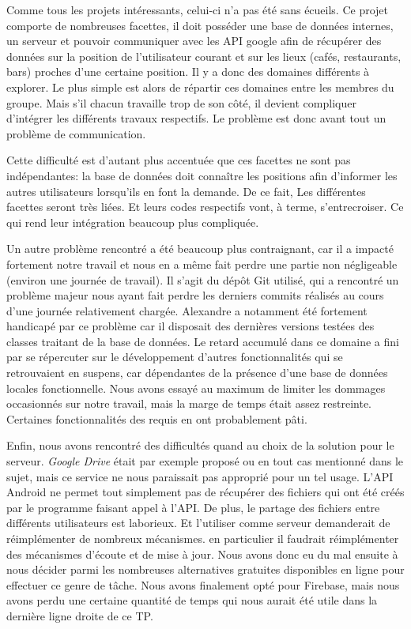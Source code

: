 Comme tous les projets intéressants, celui-ci n'a pas été sans écueils. Ce projet comporte de nombreuses facettes, il doit
posséder une base de données internes, un serveur et pouvoir communiquer avec les API google afin de récupérer des données sur la
position de l'utilisateur courant et sur les lieux (cafés, restaurants, bars) proches d'une certaine position. Il y a donc des
domaines différents à explorer. Le plus simple est alors de répartir ces domaines entre les membres du groupe. Mais s'il chacun
travaille trop de son côté, il devient compliquer d'intégrer les différents travaux respectifs. Le problème est donc avant tout un
problème de communication.
\newline

Cette difficulté est d'autant plus accentuée que ces facettes ne sont pas indépendantes: la base de données doit connaître les
positions afin d'informer les autres utilisateurs lorsqu'ils en font la demande. De ce fait, Les différentes facettes seront très
liées. Et leurs codes respectifs vont, à terme, s'entrecroiser. Ce qui rend leur intégration beaucoup plus compliquée.
\newline

Un autre problème rencontré a été beaucoup plus contraignant, car il a impacté fortement notre travail et nous en a même fait perdre une partie non négligeable (environ une journée de travail). Il s'agit du dépôt Git utilisé, qui a rencontré un problème majeur nous ayant fait perdre les derniers commits réalisés au cours d'une journée relativement chargée. Alexandre a notamment été fortement handicapé par ce problème car il disposait des dernières versions testées des classes traitant de la base de données. Le retard accumulé dans ce domaine a fini par se répercuter sur le développement d'autres fonctionnalités qui se retrouvaient en suspens, car dépendantes de la présence d'une base de données locales fonctionnelle. Nous avons essayé au maximum de limiter les dommages occasionnés sur notre travail, mais la marge de temps était assez restreinte. Certaines fonctionnalités des requis en ont probablement pâti. 

Enfin, nous avons rencontré des difficultés quand au choix de la solution pour le serveur. \textit{Google Drive} était par exemple proposé ou en tout cas mentionné dans le sujet, mais ce service ne nous paraissait pas approprié pour un tel usage. L'API Android ne permet tout simplement pas de récupérer des fichiers qui
ont été créés par le programme faisant appel à l'API. De plus, le partage des fichiers entre différents utilisateurs est
laborieux. Et l'utiliser comme serveur demanderait  de réimplémenter de nombreux mécanismes. en particulier il faudrait
réimplémenter des mécanismes d'écoute et de mise à jour. Nous avons donc eu du mal ensuite à nous décider parmi les nombreuses alternatives gratuites disponibles en ligne pour effectuer ce genre de tâche. Nous avons finalement opté pour Firebase, mais nous avons perdu une certaine quantité de temps qui nous aurait été utile dans la dernière ligne droite de ce TP.
